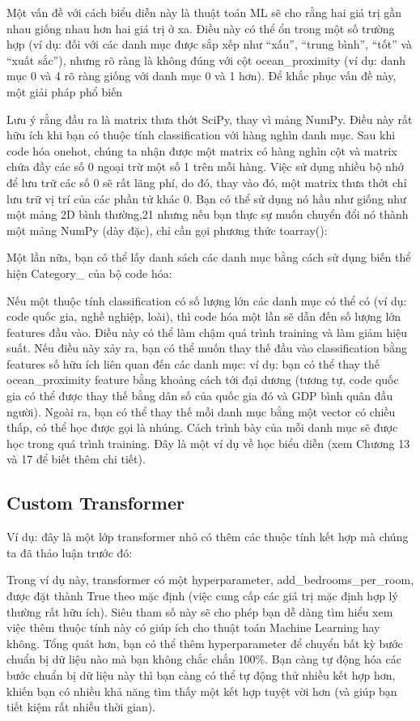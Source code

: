 Một vấn đề với cách biểu diễn này là thuật toán ML sẽ cho rằng hai giá trị gần nhau giống nhau hơn hai giá trị ở xa. Điều này có thể ổn trong một số trường hợp (ví dụ: đối với các danh mục được sắp xếp như “xấu”, “trung bình”, “tốt” và “xuất sắc”), nhưng rõ ràng là không đúng với cột ocean\_proximity (ví dụ: danh mục 0 và 4 rõ ràng giống với danh mục 0 và 1 hơn). Để khắc phục vấn đề này, một giải pháp phổ biến

Lưu ý rằng đầu ra là matrix thưa thớt SciPy, thay vì mảng NumPy. Điều này rất hữu ích khi bạn có thuộc tính classification với hàng nghìn danh mục. Sau khi code hóa onehot, chúng ta nhận được một matrix có hàng nghìn cột và matrix chứa đầy các số 0 ngoại trừ một số 1 trên mỗi hàng. Việc sử dụng nhiều bộ nhớ để lưu trữ các số 0 sẽ rất lãng phí, do đó, thay vào đó, một matrix thưa thớt chỉ lưu trữ vị trí của các phần tử khác 0. Bạn có thể sử dụng nó hầu như giống như một mảng 2D bình thường,21 nhưng nếu bạn thực sự muốn chuyển đổi nó thành một mảng NumPy (dày đặc), chỉ cần gọi phương thức toarray():

Một lần nữa, bạn có thể lấy danh sách các danh mục bằng cách sử dụng biến thể hiện Category\_ của bộ code hóa:

Nếu một thuộc tính classification có số lượng lớn các danh mục có thể có (ví dụ: code quốc gia, nghề nghiệp, loài), thì code hóa một lần sẽ dẫn đến số lượng lớn features đầu vào. Điều này có thể làm chậm quá trình training và làm giảm hiệu suất. Nếu điều này xảy ra, bạn có thể muốn thay thế đầu vào classification bằng features số hữu ích liên quan đến các danh mục: ví dụ: bạn có thể thay thế ocean\_proximity feature bằng khoảng cách tới đại dương (tương tự, code quốc gia có thể được thay thế bằng dân số của quốc gia đó và GDP bình quân đầu người). Ngoài ra, bạn có thể thay thế mỗi danh mục bằng một vector có chiều thấp, có thể học được gọi là nhúng. Cách trình bày của mỗi danh mục sẽ được học trong quá trình training. Đây là một ví dụ về học biểu diễn (xem Chương 13 và 17 để biết thêm chi tiết).

\subsection{Custom Transformer}

Ví dụ: đây là một lớp transformer nhỏ có thêm các thuộc tính kết hợp mà chúng ta đã thảo luận trước đó:

Trong ví dụ này, transformer có một hyperparameter, add\_bedrooms\_per\_room, được đặt thành True theo mặc định (việc cung cấp các giá trị mặc định hợp lý thường rất hữu ích). Siêu tham số này sẽ cho phép bạn dễ dàng tìm hiểu xem việc thêm thuộc tính này có giúp ích cho thuật toán Machine Learning hay không. Tổng quát hơn, bạn có thể thêm hyperparameter để chuyển bất kỳ bước chuẩn bị dữ liệu nào mà bạn không chắc chắn 100\%. Bạn càng tự động hóa các bước chuẩn bị dữ liệu này thì bạn càng có thể tự động thử nhiều kết hợp hơn, khiến bạn có nhiều khả năng tìm thấy một kết hợp tuyệt vời hơn (và giúp bạn tiết kiệm rất nhiều thời gian).

